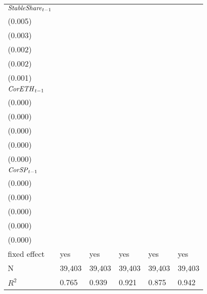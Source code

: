 \begin{tabular}{llllll}
${{\it StableShare}}_{t-1}$  &  \makecell{$0.123^{***}$ \\ (0.005)} &  \makecell{$-0.006^{**}$ \\ (0.003)} &  \makecell{$-0.007^{***}$ \\ (0.002)} &  \makecell{$0.028^{***}$ \\ (0.002)} &   \makecell{$0.012^{***}$ \\ (0.001)} \\
${{\it CorETH}}_{t-1}$       &    \makecell{$-0.000^{}$ \\ (0.000)} &     \makecell{$0.000^{}$ \\ (0.000)} &      \makecell{$0.000^{}$ \\ (0.000)} &    \makecell{$-0.000^{}$ \\ (0.000)} &     \makecell{$-0.000^{}$ \\ (0.000)} \\
${{\it CorSP}}_{t-1}$        &    \makecell{$-0.000^{}$ \\ (0.000)} &    \makecell{$-0.000^{}$ \\ (0.000)} &     \makecell{$-0.000^{}$ \\ (0.000)} &     \makecell{$0.000^{}$ \\ (0.000)} &      \makecell{$0.000^{}$ \\ (0.000)} \\
\midrule fixed effect        &                                  yes &                                  yes &                                   yes &                                  yes &                                   yes \\
N                            &                               39,403 &                               39,403 &                                39,403 &                               39,403 &                                39,403 \\
$R^2$                        &                                0.765 &                                0.939 &                                 0.921 &                                0.875 &                                 0.942 \\
\bottomrule
\end{tabular}
